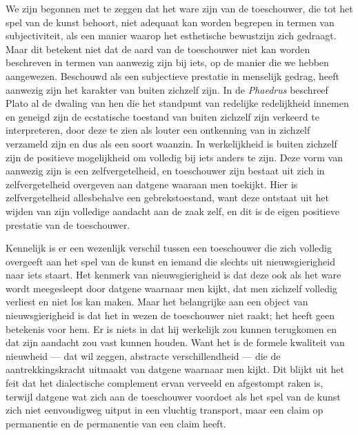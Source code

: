 We zijn begonnen met te zeggen dat het ware zijn van de toeschouwer, die tot het spel van de kunst behoort, niet adequaat kan worden begrepen in termen van subjectiviteit, als een manier waarop het esthetische bewustzijn zich gedraagt. Maar dit betekent niet dat de aard van de toeschouwer niet kan worden beschreven in termen van aanwezig zijn bij iets, op de manier die we hebben aangewezen. Beschouwd als een subjectieve prestatie in menselijk gedrag, heeft aanwezig zijn het karakter van buiten zichzelf zijn. In de \textit{Phaedrus} beschreef Plato al de dwaling van hen die het standpunt van redelijke redelijkheid innemen en geneigd zijn de ecstatische toestand van buiten zichzelf zijn verkeerd te interpreteren, door deze te zien als louter een ontkenning van in zichzelf verzameld zijn en dus als een soort waanzin. In werkelijkheid is buiten zichzelf zijn de positieve mogelijkheid om volledig bij iets anders te zijn. Deze vorm van aanwezig zijn is een zelfvergetelheid, en toeschouwer zijn bestaat uit zich in zelfvergetelheid overgeven aan datgene waaraan men toekijkt. Hier is zelfvergetelheid allesbehalve een gebrekstoestand, want deze ontstaat uit het wijden van zijn volledige aandacht aan de zaak zelf, en dit is de eigen positieve prestatie van de toeschouwer.

Kennelijk is er een wezenlijk verschil tussen een toeschouwer die zich volledig overgeeft aan het spel van de kunst en iemand die slechts uit nieuwsgierigheid naar iets staart. Het kenmerk van nieuwsgierigheid is dat deze ook als het ware wordt meegesleept door datgene waarnaar men kijkt, dat men zichzelf volledig verliest en niet los kan maken. Maar het belangrijke aan een object van nieuwsgierigheid is dat het in wezen de toeschouwer niet raakt; het heeft geen betekenis voor hem. Er is niets in dat hij werkelijk zou kunnen terugkomen en dat zijn aandacht zou vast kunnen houden. Want het is de formele kwaliteit van nieuwheid — dat wil zeggen, abstracte verschillendheid — die de aantrekkingskracht uitmaakt van datgene waarnaar men kijkt. Dit blijkt uit het feit dat het dialectische complement ervan verveeld en afgestompt raken is, terwijl datgene wat zich aan de toeschouwer voordoet als het spel van de kunst zich niet eenvoudigweg uitput in een vluchtig transport, maar een claim op permanentie en de permanentie van een claim heeft.


